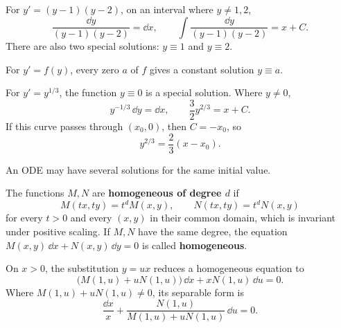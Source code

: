 \begin{exampleenv}
For $y'=(y-1)(y-2)$, on an interval where $y\ne1,2$,
\[
    \frac{\dd y}{(y-1)(y-2)}=\dd x,
    \qquad
    \int\frac{\dd y}{(y-1)(y-2)}=x+C.
\]
There are also two special solutions: $y\equiv1$ and $y\equiv2$.
\end{exampleenv}

\begin{remark}
For $y'=f(y)$, every zero $a$ of $f$ gives a constant solution $y\equiv a$.
\end{remark}

\begin{exampleenv}\label{ex:ode-cube-root}
For $y'=y^{1/3}$, the function $y\equiv0$ is a special solution.
Where $y\ne0$,
\[
    y^{-1/3}\,\dd y=\dd x,
    \qquad \frac32y^{2/3}=x+C.
\]
If this curve passes through $(x_0,0)$, then $C=-x_0$, so
\[
    y^{2/3}=\frac23(x-x_0).
\]
\begin{center}
\end{center}
\end{exampleenv}

\begin{remark}
An ODE may have several solutions for the same initial value.
\end{remark}

\begin{definitionenv}
The functions $M,N$ are \textbf{homogeneous of degree $d$} if
\[
    M(tx,ty)=t^dM(x,y),\qquad N(tx,ty)=t^dN(x,y)
\]
for every $t>0$ and every $(x,y)$ in their common domain, which is
invariant under positive scaling.
If $M,N$ have the same degree, the equation
$M(x,y)\,\dd x+N(x,y)\,\dd y=0$ is called \textbf{homogeneous}.
\end{definitionenv}

\begin{propositionenv}
On $x>0$, the substitution $y=ux$ reduces a homogeneous equation to
\[
    \bigl(M(1,u)+uN(1,u)\bigr)\,\dd x+xN(1,u)\,\dd u=0.
\]
Where $M(1,u)+uN(1,u)\ne0$, its separable form is
\[
    \frac{\dd x}{x}
    +\frac{N(1,u)}{M(1,u)+uN(1,u)}\,\dd u=0.
\]
\end{propositionenv}


